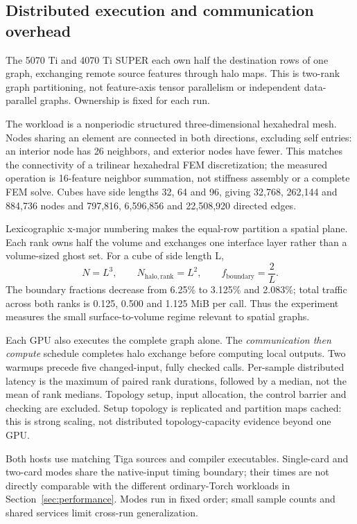 \subsection{Distributed execution and communication overhead}
\label{sec:two-host}
The 5070 Ti and 4070 Ti SUPER each own half the destination rows of one graph,
exchanging remote source features through halo maps. This is two-rank graph
partitioning, not feature-axis tensor parallelism or independent data-parallel
graphs. Ownership is fixed for each run.

The workload is a nonperiodic structured three-dimensional hexahedral mesh.
Nodes sharing an element are connected in both directions, excluding self
entries: an interior node has 26 neighbors, and exterior nodes have fewer.
This matches the connectivity of a trilinear hexahedral FEM discretization; the measured
operation is 16-feature neighbor summation, not stiffness assembly or a complete
FEM solve. Cubes have side lengths 32, 64 and 96, giving 32,768, 262,144 and
884,736 nodes and 797,816, 6,596,856 and 22,508,920 directed edges.

Lexicographic x-major numbering makes the equal-row partition a spatial plane.
Each rank owns half the volume and exchanges one interface layer rather than
a volume-sized ghost set. For a cube of side length L,
$$
N=L^3,\qquad N_{\mathrm{halo,rank}}=L^2,\qquad
f_{\mathrm{boundary}}=\frac{2}{L}.
$$
The boundary
fractions decrease from 6.25\% to 3.125\% and 2.083\%; total traffic across both
ranks is 0.125, 0.500 and 1.125 MiB per call. Thus the experiment measures the
small surface-to-volume regime relevant to spatial graphs.

Each GPU also executes the complete graph alone. The \emph{communication then
compute} schedule completes halo exchange before computing local outputs.
Two warmups precede five changed-input, fully checked calls. Per-sample distributed latency
is the maximum of paired rank durations, followed by a median, not the mean of
rank medians. Topology setup, input allocation, the control barrier and checking
are excluded. Setup topology is replicated and partition maps cached: this is
strong scaling, not distributed topology-capacity evidence beyond one GPU.

Both hosts use matching Tiga sources and compiler executables.
Single-card and two-card modes share the native-input timing boundary; their
times are not directly comparable with the different ordinary-Torch workloads
in Section~\ref{sec:performance}.
Modes run in fixed order; small sample counts and shared services limit
cross-run generalization.

